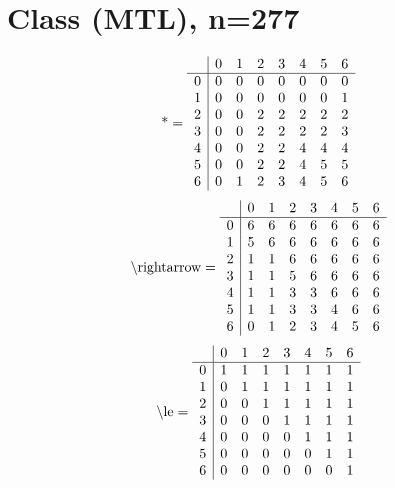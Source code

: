 \documentclass[11pt]{article}
\begin{document}
\section{Class (MTL), n=277}
\[\text{*} = 
\begin{array}{r | r r r r r r r}
 & 0 & 1 & 2 & 3 & 4 & 5 & 6 \\ \hline
0 & 0 & 0 & 0 & 0 & 0 & 0 & 0 \\
1 & 0 & 0 & 0 & 0 & 0 & 0 & 1 \\
2 & 0 & 0 & 2 & 2 & 2 & 2 & 2 \\
3 & 0 & 0 & 2 & 2 & 2 & 2 & 3 \\
4 & 0 & 0 & 2 & 2 & 4 & 4 & 4 \\
5 & 0 & 0 & 2 & 2 & 4 & 5 & 5 \\
6 & 0 & 1 & 2 & 3 & 4 & 5 & 6 \\
\end{array}
\]
\[\text{\textbackslash rightarrow} = 
\begin{array}{r | r r r r r r r}
 & 0 & 1 & 2 & 3 & 4 & 5 & 6 \\ \hline
0 & 6 & 6 & 6 & 6 & 6 & 6 & 6 \\
1 & 5 & 6 & 6 & 6 & 6 & 6 & 6 \\
2 & 1 & 1 & 6 & 6 & 6 & 6 & 6 \\
3 & 1 & 1 & 5 & 6 & 6 & 6 & 6 \\
4 & 1 & 1 & 3 & 3 & 6 & 6 & 6 \\
5 & 1 & 1 & 3 & 3 & 4 & 6 & 6 \\
6 & 0 & 1 & 2 & 3 & 4 & 5 & 6 \\
\end{array}
\]
\[\text{\textbackslash le} = 
\begin{array}{r | r r r r r r r}
 & 0 & 1 & 2 & 3 & 4 & 5 & 6 \\ \hline
0 & 1 & 1 & 1 & 1 & 1 & 1 & 1 \\
1 & 0 & 1 & 1 & 1 & 1 & 1 & 1 \\
2 & 0 & 0 & 1 & 1 & 1 & 1 & 1 \\
3 & 0 & 0 & 0 & 1 & 1 & 1 & 1 \\
4 & 0 & 0 & 0 & 0 & 1 & 1 & 1 \\
5 & 0 & 0 & 0 & 0 & 0 & 1 & 1 \\
6 & 0 & 0 & 0 & 0 & 0 & 0 & 1 \\
\end{array}
\]
\end{document}
